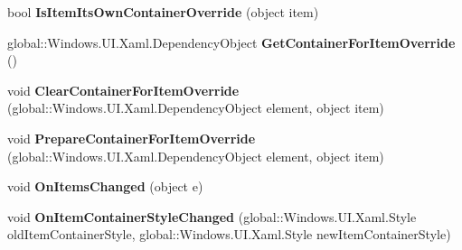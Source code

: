 \begin{DoxyCompactItemize}
\item 
\mbox{\label{interface_windows_1_1_u_i_1_1_xaml_1_1_controls_1_1_i_items_control_overrides_ad9d9073fc349d2a457c581129484ff0f}} 
bool {\bfseries Is\+Item\+Its\+Own\+Container\+Override} (object item)
\item 
\mbox{\label{interface_windows_1_1_u_i_1_1_xaml_1_1_controls_1_1_i_items_control_overrides_a623f7e1da828fb4e0ab4990fc2047874}} 
global\+::\+Windows.\+U\+I.\+Xaml.\+Dependency\+Object {\bfseries Get\+Container\+For\+Item\+Override} ()
\item 
\mbox{\label{interface_windows_1_1_u_i_1_1_xaml_1_1_controls_1_1_i_items_control_overrides_aa7629a88ebc4029aab0c438c06ec0b82}} 
void {\bfseries Clear\+Container\+For\+Item\+Override} (global\+::\+Windows.\+U\+I.\+Xaml.\+Dependency\+Object element, object item)
\item 
\mbox{\label{interface_windows_1_1_u_i_1_1_xaml_1_1_controls_1_1_i_items_control_overrides_a4ebcd3ec353d6e23fb9fc344cc643e0e}} 
void {\bfseries Prepare\+Container\+For\+Item\+Override} (global\+::\+Windows.\+U\+I.\+Xaml.\+Dependency\+Object element, object item)
\item 
\mbox{\label{interface_windows_1_1_u_i_1_1_xaml_1_1_controls_1_1_i_items_control_overrides_aeca7ab8e157178a6cc021cee26bf5388}} 
void {\bfseries On\+Items\+Changed} (object e)
\item 
\mbox{\label{interface_windows_1_1_u_i_1_1_xaml_1_1_controls_1_1_i_items_control_overrides_aec19844110896dfbbe9fb5a9ddea5cea}} 
void {\bfseries On\+Item\+Container\+Style\+Changed} (global\+::\+Windows.\+U\+I.\+Xaml.\+Style old\+Item\+Container\+Style, global\+::\+Windows.\+U\+I.\+Xaml.\+Style new\+Item\+Container\+Style)
\item 
\mbox{\label{interface_windows_1_1_u_i_1_1_xaml_1_1_controls_1_1_i_items_control_overrides_a4d197dd9f2dbb42d5ba7828014c6d966}} 

\end{DoxyCompactItemize}
